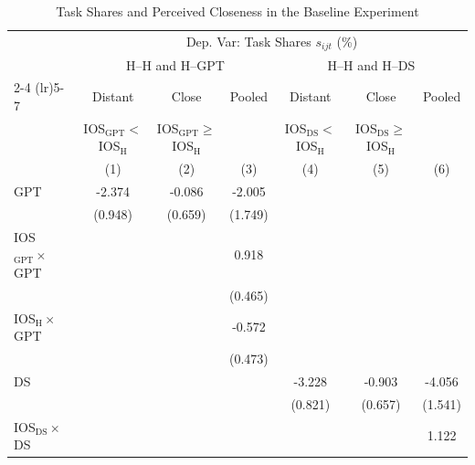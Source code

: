 \begin{table}[H]
\centering
\caption{Task Shares and Perceived Closeness in the Baseline Experiment}
\footnotesize
\begin{threeparttable}
\begin{tabular}{l*{6}{c}}
\toprule\toprule
& \multicolumn{6}{c}{Dep. Var: Task Shares $s_{ijt}$ (\%)} \\
& \multicolumn{3}{c}{H--H and H--GPT} & \multicolumn{3}{c}{H--H and H--DS} \\
\cmidrule(lr){2-4} \cmidrule(lr){5-7}
& Distant & Close & Pooled & Distant & Close & Pooled \\
& {\scriptsize IOS$_{\text{GPT}}<$ IOS$_{\text{H}}$} & {\scriptsize IOS$_{\text{GPT}}\geq$ IOS$_{\text{H}}$} & & {\scriptsize IOS$_{\text{DS}}<$ IOS$_{\text{H}}$} & {\scriptsize IOS$_{\text{DS}}\geq$ IOS$_{\text{H}}$} & \\
& (1) & (2) & (3) & (4) & (5) & (6) \\
\midrule
\midrule
GPT         &      -2.374\sym{**} &      -0.086         &      -2.005         &                     &                     &                     \\
            &     (0.948)         &     (0.659)         &     (1.749)         &                     &                     &                     \\
\addlinespace
IOS$_{\text{GPT}}\times$ GPT&                     &                     &       0.918\sym{**} &                     &                     &                     \\
            &                     &                     &     (0.465)         &                     &                     &                     \\
\addlinespace
IOS$_{\text{H}}\times$ GPT&                     &                     &      -0.572         &                     &                     &                     \\
            &                     &                     &     (0.473)         &                     &                     &                     \\
\addlinespace
DS          &                     &                     &                     &      -3.228\sym{***}&      -0.903         &      -4.056\sym{***}\\
            &                     &                     &                     &     (0.821)         &     (0.657)         &     (1.541)         \\
\addlinespace
IOS$_{\text{DS}}\times$ DS&                     &                     &                     &                     &                     &       1.122\sym{***}\\

\end{tabular}
\end{threeparttable}
\end{table}
